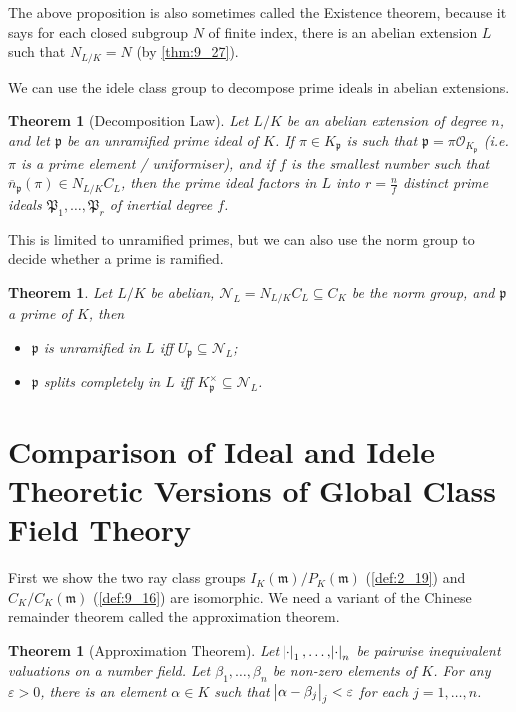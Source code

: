 \documentclass[11pt]{article}
\theoremstyle{definition}
\theoremstyle{plain}
\newtheorem{theorem}[definition]{Theorem}
\theoremstyle{remark}
\newcommand{\cO}{\mathcal{O}}
\newcommand{\cp}{\mathfrak{P}}
\newcommand{\cN}{\mathcal{N}}
\newcommand{\fp}{\mathfrak{p}}
\newcommand{\fm}{\mathfrak{m}}
\begin{document}
The above proposition is also sometimes called the Existence theorem, because it says for each closed subgroup $N$ of finite index, there is an abelian extension $L$ such that $N_{L/K} = N$ (by \autoref{thm:9_27}).

We can use the idele class group to decompose prime ideals in abelian extensions.

\begin{theorem}[Decomposition Law]\label{thm:9_30}
    Let $L/K$ be an abelian extension of degree $n$, and let $\fp$ be an unramified prime ideal of $K$. If $\pi \in K_\fp$ is such that $\fp = \pi \cO_{K_\fp}$ (i.e. $\pi$ is a prime element / uniformiser), and if $f$ is the smallest number such that $\overline{n}_\fp(\pi) \in N_{L/K} C_L$, then the prime ideal factors in $L$ into $r = \frac{n}{f}$ distinct prime ideals $\cp_1, \ldots, \cp_r$ of inertial degree $f$.
\end{theorem}

This is limited to unramified primes, but we can also use the norm group to decide whether a prime is ramified.

\begin{theorem}\label{thm:9_31}
    Let $L/K$ be abelian, $\cN_L = N_{L/K} C_L \subseteq C_K$ be the norm group, and $\fp$ a prime of $K$, then
    \begin{itemize}
        \item $\fp$ is unramified in $L$ iff $U_\fp \subseteq \cN_L$;
        \item $\fp$ splits completely in $L$ iff $K_\fp^\times \subseteq \cN_L$.
    \end{itemize}
\end{theorem}

\section{Comparison of Ideal and Idele Theoretic Versions of Global Class Field Theory}

First we show the two ray class groups $I_K(\fm) / P_K(\fm)$ (\autoref{def:2_19}) and $C_K / C_K(\fm)$ (\autoref{def:9_16}) are isomorphic. We need a variant of the Chinese remainder theorem called the approximation theorem.

\begin{theorem}[Approximation Theorem]\label{thm:10_1}
    Let $\abs{\cdot}_1, \ldots, \abs{\cdot}_n$ be pairwise inequivalent valuations on a number field. Let $\beta_1, \ldots, \beta_n$ be non-zero elements of $K$. For any $\varepsilon > 0$, there is an element $\alpha \in K$ such that $\abs{\alpha - \beta_j}_j < \varepsilon$ for each $j=1,\ldots,n$.
\end{theorem}
\end{document}
